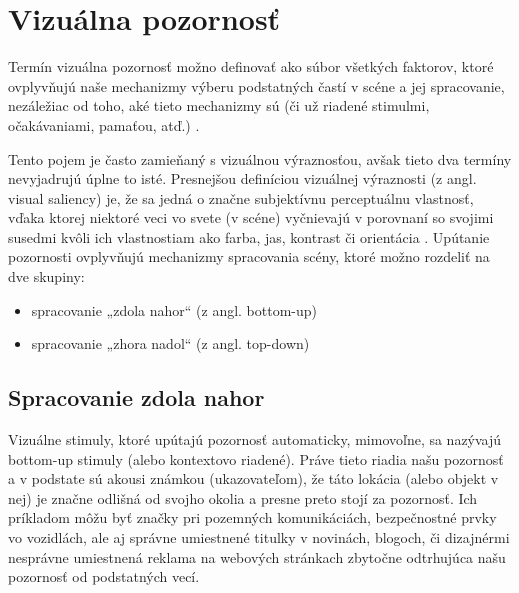 \newpage

\section{Vizuálna pozornosť}
\label{saliency}
	
Termín vizuálna pozornosť možno definovať ako súbor všetkých faktorov, ktoré ovplyvňujú naše mechanizmy výberu podstatných častí v scéne a jej spracovanie, nezáležiac od toho, aké tieto mechanizmy sú (či už riadené stimulmi, očakávaniami, pamaťou, atď.) \cite{borji2013state}.

Tento pojem je často zamieňaný s vizuálnou výraznosťou, avšak tieto dva termíny nevyjadrujú úplne to isté. Presnejšou definíciou vizuálnej výraznosti (z angl. visual saliency) je, že sa jedná o značne subjektívnu perceptuálnu vlastnosť, vďaka ktorej niektoré veci vo svete (v scéne) vyčnievajú v porovnaní so svojimi susedmi kvôli ich vlastnostiam ako farba, jas, kontrast či orientácia \cite{itti2007visual}. Upútanie pozornosti ovplyvňujú mechanizmy spracovania scény, ktoré možno rozdeliť na dve skupiny:
\begin{itemize}
	\item spracovanie „zdola nahor“ (z angl. bottom-up) %
	\item spracovanie „zhora nadol“ (z angl. top-down) %
	
\end{itemize}


\subsection{Spracovanie zdola nahor}
Vizuálne stimuly, ktoré upútajú pozornosť automaticky, mimovoľne, sa nazývajú bottom-up stimuly (alebo kontextovo riadené). Práve tieto riadia našu pozornosť a v podstate sú akousi známkou (ukazovateľom), že táto lokácia (alebo objekt v nej) je značne odlišná od svojho okolia a presne preto stojí za pozornosť. Ich príkladom môžu byť značky pri pozemných komunikáciách, bezpečnostné prvky vo vozidlách, ale aj správne umiestnené titulky v novinách, blogoch, či dizajnérmi nesprávne umiestnená reklama na webových stránkach zbytočne odtrhujúca našu pozornosť od podstatných vecí. 

